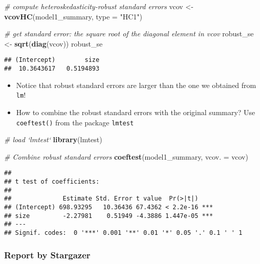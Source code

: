 \documentclass[]{book}
\newenvironment{Shaded}{\begin{snugshade}}{\end{snugshade}}
\newcommand{\CommentTok}[1]{\textcolor[rgb]{0.56,0.35,0.01}{\textit{#1}}}
\newcommand{\DataTypeTok}[1]{\textcolor[rgb]{0.13,0.29,0.53}{#1}}
\newcommand{\KeywordTok}[1]{\textcolor[rgb]{0.13,0.29,0.53}{\textbf{#1}}}
\newcommand{\NormalTok}[1]{#1}
\newcommand{\StringTok}[1]{\textcolor[rgb]{0.31,0.60,0.02}{#1}}
\providecommand{\tightlist}{%
  \setlength{\itemsep}{0pt}\setlength{\parskip}{0pt}}
\begin{document}
\begin{Shaded}
\begin{Highlighting}[]
\CommentTok{# compute heteroskedasticity-robust standard errors}
\NormalTok{vcov <-}\StringTok{ }\KeywordTok{vcovHC}\NormalTok{(model1_summary, }\DataTypeTok{type =} \StringTok{"HC1"}\NormalTok{)}

\CommentTok{# get standard error: the square root of the diagonal element in vcov}
\NormalTok{robust_se <-}\StringTok{ }\KeywordTok{sqrt}\NormalTok{(}\KeywordTok{diag}\NormalTok{(vcov))}
\NormalTok{robust_se}
\end{Highlighting}
\end{Shaded}

\begin{verbatim}
## (Intercept)        size 
##  10.3643617   0.5194893
\end{verbatim}

\begin{itemize}
\tightlist
\item
  Notice that robust standard errors are larger than the one we obtained from \texttt{lm}!
\item
  How to combine the robust standard errors with the original summary? Use \texttt{coeftest()} from the package \texttt{lmtest}
\end{itemize}

\begin{Shaded}
\begin{Highlighting}[]
\CommentTok{# load `lmtest`}
\KeywordTok{library}\NormalTok{(lmtest)}

\CommentTok{# Combine robust standard errors}
\KeywordTok{coeftest}\NormalTok{(model1_summary, }\DataTypeTok{vcov. =}\NormalTok{ vcov)}
\end{Highlighting}
\end{Shaded}

\begin{verbatim}
## 
## t test of coefficients:
## 
##              Estimate Std. Error t value  Pr(>|t|)    
## (Intercept) 698.93295   10.36436 67.4362 < 2.2e-16 ***
## size         -2.27981    0.51949 -4.3886 1.447e-05 ***
## ---
## Signif. codes:  0 '***' 0.001 '**' 0.01 '*' 0.05 '.' 0.1 ' ' 1
\end{verbatim}

\hypertarget{report-by-stargazer}{%
\subsubsection{Report by Stargazer}\label{report-by-stargazer}}
\end{document}

